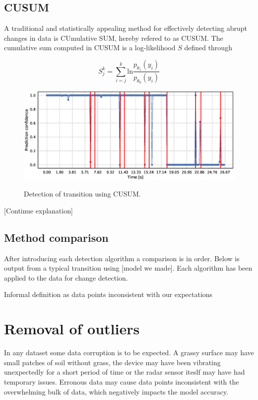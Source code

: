 \subsection{CUSUM}

A traditional and statistically appealing method for effectively detecting abrupt changes in data is CUmulative SUM, hereby refered to as CUSUM. The cumulative sum computed in CUSUM is a log-likelihood $S$ defined through

\begin{equation}
	S_j^k = \sum_{i=j}^k \text{ln}\frac{p_{\theta_1}(y_i)}{p_{\theta_0}(y_i)}
\end{equation}

\begin{figure}
	\includegraphics[scale=0.08]{figs_temp/detect_cusum}
	\label{fig:detect_cusum}
	\caption{Detection of transition using CUSUM.}
\end{figure}

[Continue explanation]


\citep{basseville_nikiforov_1993}




\subsection{Method comparison}

After introducing each detection algorithm a comparison is in order. Below is output from a typical transition using [model we made]. Each algorithm has been applied to the data for change detection.


Informal definition as data points inconsistent with our expectations

\section{Removal of outliers}

In any dataset some data corruption is to be expected. A grassy surface may have small patches of soil without grass, the device may have been vibrating unexpectedly for a short period of time or the radar sensor iteslf may have had temporary issues. Erronous data may cause data points inconsistent with the overwhelming bulk of data, which negatively impacts the model accuracy. 

